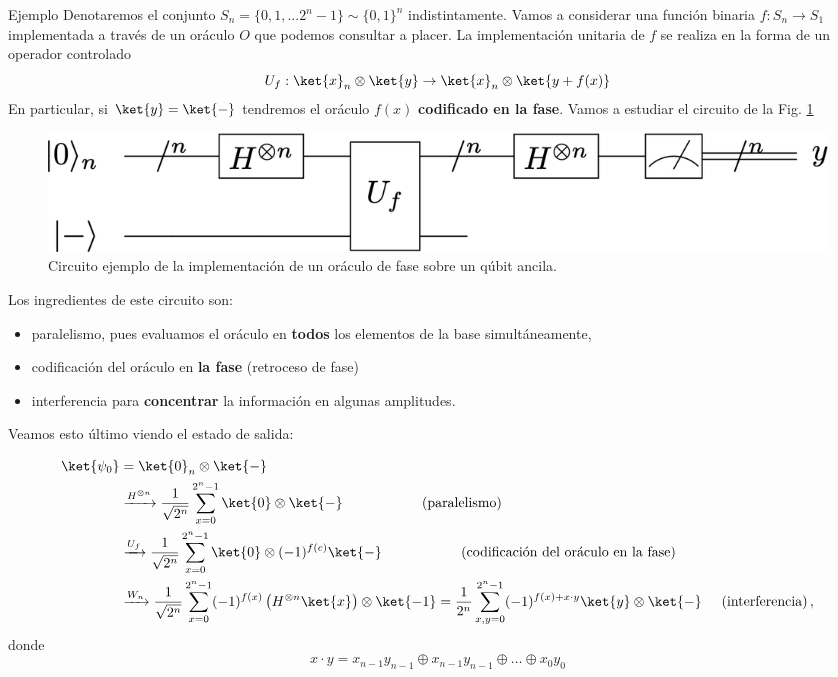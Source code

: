\documentclass[a4paper,11pt]{book} %
\numberwithin{equation}{chapter}
\def\lp{\left(}
\def\rp{\right)}
\begin{document}
	\begin{mybox_green}{Ejemplo}
	Denotaremos el conjunto $S_n =\{0,1,...2^n-1 \}\sim \{0,1\}^n$ indistintamente. Vamos a considerar una función binaria  $f:S_n \to S_1$ implementada
	 a través de un oráculo $O$ que podemos consultar a placer. La implementación unitaria de $f$ se realiza en la forma de un operador controlado
	$$
	{U_f} : \ket{x}_n\otimes \ket{y} \to \ket{x}_n\otimes \ket{y + f(x)}
	$$
	En particular, si $\ket{y} = \ket{-}$ tendremos el oráculo $f(x)$ \textbf{codificado en la fase}. Vamos a estudiar el circuito de la Fig. \ref{Fig_algoritmos_didac_Busqueda_Oraculo}
		\begin{figure}[H]
		\centering 
		\includegraphics[width=0.65\linewidth]{Figuras/Fig_algoritmos_didac_Busqueda_Oraculo.png}
		\caption{Circuito ejemplo de la implementación de un oráculo de fase sobre un qúbit ancila.}
		\label{Fig_algoritmos_didac_Busqueda_Oraculo}
		\end{figure}
		
	Los ingredientes de este circuito son:
	\begin{itemize}
		\item paralelismo, pues evaluamos el oráculo en \textbf{todos} los elementos de la base simultáneamente,
		\item codificación del oráculo en \textbf{la fase} (retroceso de fase)
		\item interferencia para \textbf{concentrar} la información en algunas amplitudes.
	\end{itemize}
    Veamos esto último viendo el estado de salida:
    
    \begin{align*}
    \ket{\psi_0} & = \ket{0}_n \otimes \ket{-} \\
    & \xrightarrow{H^{\otimes n}}   \frac{1}{\sqrt{2^n}} \sum^{2^n -1}_{x=0} \ket{0} \otimes \ket{-} \hspace{2cm} \text{(paralelismo)} \\
    & \xrightarrow{U_f}             \frac{1}{\sqrt{2^n}} \sum^{2^n -1}_{x=0} \ket{0} \otimes (-1)^{f(c)} \ket{-} \hspace{2cm} \text{(codificación del oráculo en la fase)} \\
    & \xrightarrow{W_n}  			\frac{1}{\sqrt{2^n}} \sum^{2^n -1}_{x=0} (-1)^{f(x)} \lp H^{\otimes n} \ket{x} \rp \otimes \ket{-1} = 
      \frac{1}{2^n} \sum^{2^n -1}_{x,y=0} (-1)^{f(x)+x\cdot y}  \ket{y} \otimes \ket{-}  \hspace{0.5cm}  \text{(interferencia)} \, ,
    \end{align*}
	donde
	$$
	x\cdot y = x_{n-1} y_{n-1} \oplus x_{n-1} y_{n-1} \oplus \ldots \oplus x_0 y_0
	$$
	

\end{mybox_green}
\end{document}
